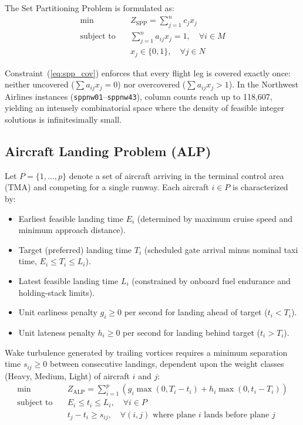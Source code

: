 \documentclass[10pt,journal,compsoc]{IEEEtran}
\begin{document}
The Set Partitioning Problem is formulated as:
\begin{align}
\min \quad & Z_{\text{SPP}} = \sum_{j=1}^n c_j x_j \label{eq:spp_obj} \\
\text{subject to} \quad & \sum_{j=1}^n a_{ij} x_j = 1, \quad \forall i \in M \label{eq:spp_cov} \\
& x_j \in \{0, 1\}, \quad \forall j \in N \label{eq:spp_bin}
\end{align}

Constraint~(\ref{eq:spp_cov}) enforces that every flight leg is covered exactly once: neither uncovered ($\sum a_{ij} x_j = 0$) nor overcovered ($\sum a_{ij} x_j > 1$). In the Northwest Airlines instances (\texttt{sppnw01}--\texttt{sppnw43}), column counts reach up to 118,607, yielding an intensely combinatorial space where the density of feasible integer solutions is infinitesimally small.

\subsection{Aircraft Landing Problem (ALP)}
Let $P = \{1, \dots, p\}$ denote a set of aircraft arriving in the terminal control area (TMA) and competing for a single runway. Each aircraft $i \in P$ is characterized by:
\begin{itemize}
    \item Earliest feasible landing time $E_i$ (determined by maximum cruise speed and minimum approach distance).
    \item Target (preferred) landing time $T_i$ (scheduled gate arrival minus nominal taxi time, $E_i \le T_i \le L_i$).
    \item Latest feasible landing time $L_i$ (constrained by onboard fuel endurance and holding-stack limits).
    \item Unit earliness penalty $g_i \ge 0$ per second for landing ahead of target ($t_i < T_i$).
    \item Unit lateness penalty $h_i \ge 0$ per second for landing behind target ($t_i > T_i$).
\end{itemize}

Wake turbulence generated by trailing vortices requires a minimum separation time $s_{ij} \ge 0$ between consecutive landings, dependent upon the weight classes (Heavy, Medium, Light) of aircraft $i$ and $j$:
\begin{align}
\min \quad & Z_{\text{ALP}} = \sum_{i=1}^p \left( g_i \max(0, T_i - t_i) + h_i \max(0, t_i - T_i) \right) \label{eq:alp_obj} \\
\text{subject to} \quad & E_i \le t_i \le L_i, \quad \forall i \in P \label{eq:alp_window} \\
& t_j - t_i \ge s_{ij}, \quad \forall (i, j) \text{ where plane } i \text{ lands before plane } j \label{eq:alp_sep}
\end{align}
\end{document}
